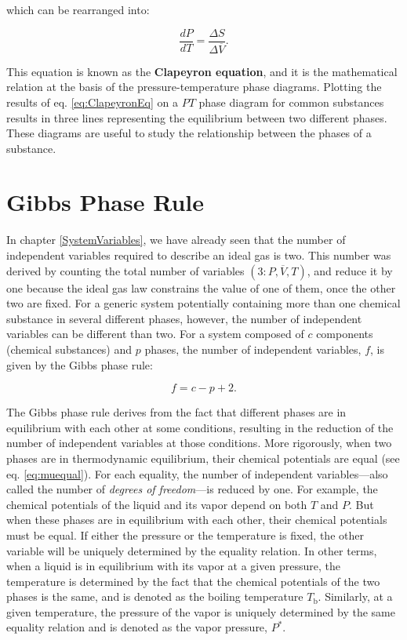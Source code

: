 \documentclass[
  9pt,
]{extbook}
\theoremstyle{definition}
\theoremstyle{definition}
\theoremstyle{definition}
\theoremstyle{remark}
\begin{document}
which can be rearranged into:

\begin{equation}
\frac{dP}{dT}=\frac{\Delta S}{\Delta \overline{V}}.
\label{eq:ClapeyronEq}
\end{equation}

This equation is known as the \textbf{Clapeyron equation}, and it is the mathematical relation at the basis of the pressure-temperature phase diagrams. Plotting the results of eq. \eqref{eq:ClapeyronEq} on a \(PT\) phase diagram for common substances results in three lines representing the equilibrium between two different phases. These diagrams are useful to study the relationship between the phases of a substance.

\hypertarget{gibbs-phase-rule}{%
\section{Gibbs Phase Rule}\label{gibbs-phase-rule}}

In chapter \ref{SystemVariables}, we have already seen that the number of independent variables required to describe an ideal gas is two. This number was derived by counting the total number of variables \((3: P,\overline{V},T)\), and reduce it by one because the ideal gas law constrains the value of one of them, once the other two are fixed. For a generic system potentially containing more than one chemical substance in several different phases, however, the number of independent variables can be different than two. For a system composed of \(c\) components (chemical substances) and \(p\) phases, the number of independent variables, \(f\), is given by the Gibbs phase rule:

\begin{equation}
f=c-p+2.
\label{eq:Gibbsrule}
\end{equation}

The Gibbs phase rule derives from the fact that different phases are in equilibrium with each other at some conditions, resulting in the reduction of the number of independent variables at those conditions. More rigorously, when two phases are in thermodynamic equilibrium, their chemical potentials are equal (see eq. \eqref{eq:muequal}). For each equality, the number of independent variables---also called the number of \emph{degrees of freedom}---is reduced by one. For example, the chemical potentials of the liquid and its vapor depend on both \(T\) and \(P\). But when these phases are in equilibrium with each other, their chemical potentials must be equal. If either the pressure or the temperature is fixed, the other variable will be uniquely determined by the equality relation. In other terms, when a liquid is in equilibrium with its vapor at a given pressure, the temperature is determined by the fact that the chemical potentials of the two phases is the same, and is denoted as the boiling temperature \(T_{\text{b}}\). Similarly, at a given temperature, the pressure of the vapor is uniquely determined by the same equality relation and is denoted as the vapor pressure, \(P^*\).
\end{document}

